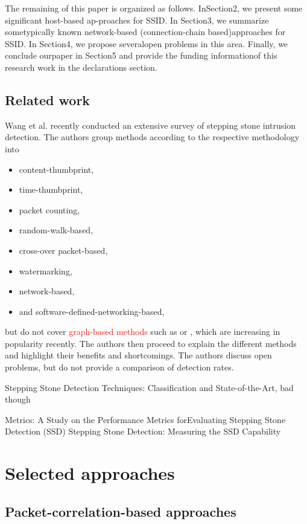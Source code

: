 \documentclass[conference]{IEEEtran}\usepackage[]{graphicx}\usepackage[]{color}
\begin{document}
The remaining of this paper is organized as follows. InSection2, we present some significant host-based ap-proaches for SSID. In Section3, we summarize sometypically known network-based (connection-chain based)approaches for SSID. In Section4, we propose severalopen problems in this area. Finally, we conclude ourpaper in Section5 and provide the funding informationof this research work in the declarations section.

\subsection{Related work}

Wang et al. recently conducted an extensive survey of \cite{wang2018research} stepping stone intrusion detection. The authors group methods according to the respective methodology into 
\begin{itemize}
\item content-thumbprint,
\item time-thumbprint,
\item packet counting,
\item random-walk-based,
\item cross-over packet-based,
\item watermarking,
\item network-based,
\item and software-defined-networking-based, 
\end{itemize} 
but do not cover \textcolor{red}{graph-based methods} such as \cite{gamarra2018analysis} or \cite{apruzzese2017detection}, which are increasing in popularity recently.
The authors then proceed to explain the different methods and highlight their benefits and shortcomings. The authors discuss open problems, but do not provide a comparison of detection rates. 


\cite{shullich2011survey}

\cite{almulhem2007survey}

Stepping Stone Detection Techniques: Classification and State-of-the-Art, bad though

Metrics: A Study on the Performance Metrics forEvaluating Stepping Stone Detection (SSD)
Stepping Stone Detection: Measuring the SSD Capability


\section{Selected approaches}

\subsection{Packet-correlation-based approaches}
\end{document}
